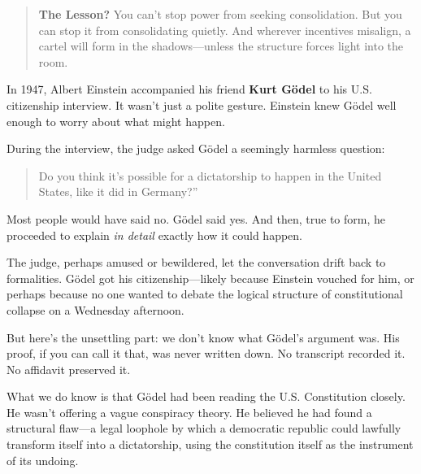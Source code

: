 \medskip

\begin{quote}
\textbf{The Lesson?} You can’t stop power from seeking consolidation. But you can stop it from consolidating quietly. And wherever incentives misalign, a cartel will form in the shadows—unless the structure forces light into the room.
\end{quote}


\begin{tcolorbox}[title=Historical Sidebar: Gödel’s Missing Proof — The Constitutional Loophole That Was Never Written Down, colback=gray!5!white, colframe=black!80!white, breakable, fonttitle=\bfseries]

  In 1947, Albert Einstein accompanied his friend \textbf{Kurt Gödel} to his U.S. citizenship interview. It wasn’t just a polite gesture. Einstein knew Gödel well enough to worry about what might happen.  

  \medskip
  
  During the interview, the judge asked Gödel a seemingly harmless question:  

  \begin{quote}
  Do you think it’s possible for a dictatorship to happen in the United States, like it did in Germany?”
  \end{quote}
  
  Most people would have said no. Gödel said yes. And then, true to form, he proceeded to explain \textit{in detail} exactly how it could happen.  

  \medskip
  
  The judge, perhaps amused or bewildered, let the conversation drift back to formalities. Gödel got his citizenship—likely because Einstein vouched for him, or perhaps because no one wanted to debate the logical structure of constitutional collapse on a Wednesday afternoon.  

  \medskip
  
  But here’s the unsettling part: we don’t know what Gödel’s argument was. His proof, if you can call it that, was never written down. No transcript recorded it. No affidavit preserved it.  

  \medskip
  
  What we do know is that Gödel had been reading the U.S. Constitution closely. He wasn’t offering a vague conspiracy theory. He believed he had found a structural flaw—a legal loophole by which a democratic republic could lawfully transform itself into a dictatorship, using the constitution itself as the instrument of its undoing.  


\end{tcolorbox}
